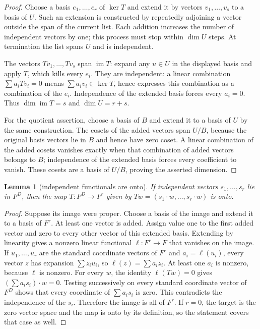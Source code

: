 \documentclass{article}
\newtheorem{lemma}{Lemma}
\begin{document}
\begin{proof}
Choose a basis \(e_1,\ldots ,e_r\) of \(\ker  T\) and
extend it by vectors \(v_1,\ldots ,v_s\) to a basis of \(U\). Such
an extension is constructed by repeatedly adjoining a vector outside the
span of the current list. Each addition increases the number of
independent vectors by one; this process must stop within \(\dim  U\)
steps. At termination the list spans \(U\) and is independent.

The vectors \(Tv_1,\ldots ,Tv_s\) span \(\operatorname{im} T\): expand
any \(u\in U\) in the displayed basis and apply \(T\), which kills every
\(e_i\). They are independent: a linear combination \(\sum  a_iTv_i=0\)
means \(\sum  a_iv_i\in \ker  T\), hence expresses this combination as a
combination of the \(e_i\). Independence of the extended basis forces
every \(a_i=0\). Thus \(\dim  \operatorname{im} T=s\) and
\(\dim  U=r+s\).

For the quotient assertion, choose a basis of \(B\) and extend it to a
basis of \(U\) by the same construction. The cosets of the added vectors
span \(U/B\), because the original basis vectors lie in \(B\) and hence
have zero coset. A linear combination of the added cosets vanishes
exactly when that combination of added vectors belongs to \(B\);
independence of the extended basis forces every coefficient to vanish.
These cosets are a basis of \(U/B\), proving the asserted dimension.
\end{proof}

\begin{lemma}[independent functionals are onto]\label{lem:onto}
If independent vectors \(s_1,\ldots ,s_r\) lie in
\(F^D\), then the map \(T:F^D\to F^r\) given by
\(Tw=(s_1\cdot w,\ldots ,s_r\cdot w)\) is onto.
\end{lemma}

\begin{proof}
Suppose its image were proper. Choose a basis of the
image and extend it to a basis of \(F^r\). At least one vector is added.
Assign value one to the first added vector and zero to every other
vector of this extended basis. Extending by linearity gives a nonzero
linear functional \(\ell :F^r\to F\) that vanishes on the image. If
\(u_1,\ldots ,u_r\) are the standard coordinate vectors of \(F^r\) and
\(a_i=\ell (u_i)\), every vector \(z\) has expansion \(\sum z_iu_i\), so
\(\ell (z)=\sum a_iz_i\). At least one \(a_i\) is nonzero, because
\(\ell\) is nonzero. For every \(w\), the identity \(\ell (Tw)=0\) gives
\((\sum a_is_i)\cdot w=0\). Testing successively on every standard
coordinate vector of \(F^D\) shows that every coordinate of
\(\sum a_is_i\) is zero. This contradicts the independence of the
\(s_i\). Therefore the image is all of \(F^r\). If \(r=0\), the target
is the zero vector space and the map is onto by its definition, so the
statement covers that case as well.
\end{proof}
\end{document}
